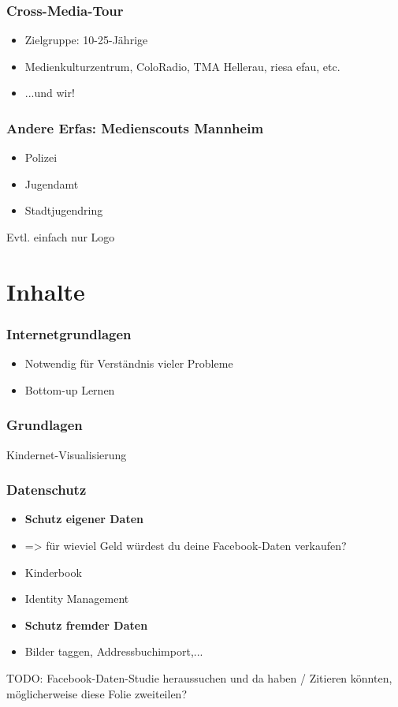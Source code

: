 \documentclass[12pt]{beamer}
\begin{document}
\begin{frame}
  \frametitle{Cross-Media-Tour}
  \begin{itemize}
    \item Zielgruppe: 10-25-Jährige
    \item Medienkulturzentrum, ColoRadio, TMA Hellerau, riesa efau, etc.
    \item ...und wir!
  \end{itemize}
\end{frame}

\begin{frame}
  \frametitle{Andere Erfas: Medienscouts Mannheim}
  \begin{itemize}
    \item Polizei
    \item Jugendamt
    \item Stadtjugendring
  \end{itemize}
  Evtl. einfach nur Logo
\end{frame}

\section{Inhalte}

\begin{frame}
  \frametitle{Internetgrundlagen}
  \begin{itemize}
    \item Notwendig für Verständnis vieler Probleme
    \item Bottom-up Lernen
  \end{itemize}
\end{frame}

\begin{frame}
  \frametitle{Grundlagen}
  Kindernet-Visualisierung
\end{frame}

\begin{frame}
  \frametitle{Datenschutz}
  \begin{itemize}
    \item \textbf{Schutz eigener Daten}
    \item => für wieviel Geld würdest du deine Facebook-Daten verkaufen?
    \item Kinderbook
    \item Identity Management
    \item \textbf{Schutz fremder Daten}
    \item Bilder taggen, Addressbuchimport,...
  \end{itemize}
  TODO: Facebook-Daten-Studie heraussuchen und da haben / Zitieren könnten, möglicherweise diese Folie zweiteilen?
\end{frame}
\end{document}
